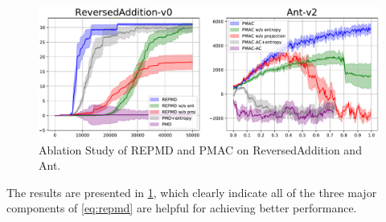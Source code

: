 \begin{figure}[t]
\begin{center}
\includegraphics[width=0.5\linewidth]{./ablation-results.pdf}
\end{center}
\caption{Ablation Study of REPMD and PMAC %
on ReversedAddition and Ant. }
\label{fig:ablation}
\end{figure}

The results are presented in \cref{fig:ablation},
which clearly indicate all of the three major components of \cref{eq:repmd}
are helpful for achieving better performance. 

